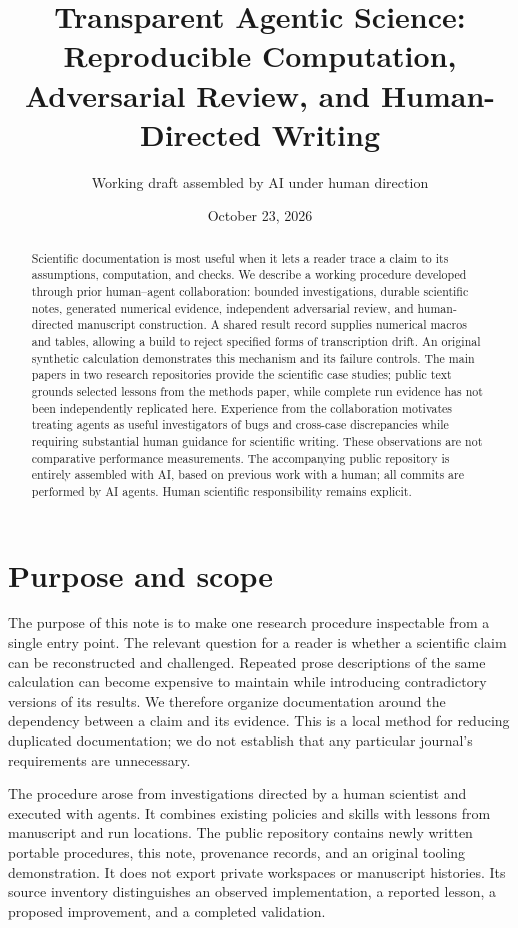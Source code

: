 \documentclass{article}
\title{Transparent Agentic Science:\\ Reproducible Computation, Adversarial Review, and Human-Directed Writing}
\author{Working draft assembled by AI under human direction}
\date{October 23, 2026}
\begin{document}
\maketitle
\begin{abstract}
Scientific documentation is most useful when it lets a reader trace a claim to its assumptions, computation, and checks. We describe a working procedure developed through prior human--agent collaboration: bounded investigations, durable scientific notes, generated numerical evidence, independent adversarial review, and human-directed manuscript construction. A shared result record supplies numerical macros and tables, allowing a build to reject specified forms of transcription drift. An original synthetic calculation demonstrates this mechanism and its failure controls. The main papers in two research repositories provide the scientific case studies; public text grounds selected lessons from the methods paper, while complete run evidence has not been independently replicated here. Experience from the collaboration motivates treating agents as useful investigators of bugs and cross-case discrepancies while requiring substantial human guidance for scientific writing. These observations are not comparative performance measurements. The accompanying public repository is entirely assembled with AI, based on previous work with a human; all commits are performed by AI agents. Human scientific responsibility remains explicit.
\end{abstract}

\section{Purpose and scope}
The purpose of this note is to make one research procedure inspectable from a single entry point. The relevant question for a reader is whether a scientific claim can be reconstructed and challenged. Repeated prose descriptions of the same calculation can become expensive to maintain while introducing contradictory versions of its results. We therefore organize documentation around the dependency between a claim and its evidence. This is a local method for reducing duplicated documentation; we do not establish that any particular journal's requirements are unnecessary.

The procedure arose from investigations directed by a human scientist and executed with agents. It combines existing policies and skills with lessons from manuscript and run locations. The public repository contains newly written portable procedures, this note, provenance records, and an original tooling demonstration. It does not export private workspaces or manuscript histories. Its source inventory distinguishes an observed implementation, a reported lesson, a proposed improvement, and a completed validation.
\end{document}
